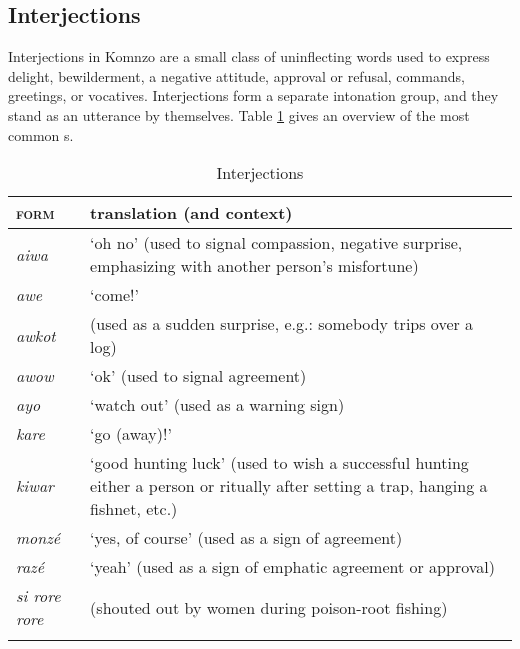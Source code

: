 \subsection{Interjections} \label{interjectionsec}
\vspace{-0.2cm}
Interjections in Komnzo are a small class of uninflecting words used to express delight, bewilderment, a negative attitude, approval or refusal, commands, greetings, or vocatives. Interjections form a separate intonation group, and they stand as an utterance by themselves. Table \ref{interjections} gives an overview of the most common s.
\vspace{-0.2cm}
\begin{table}
\caption{Interjections}
\label{interjections}
	\begin{tabular}{lp{}}
		\lsptoprule
		\textsc{form}&{translation (and context)}\\\midrule
		\emph{aiwa}&`oh no' (used to signal compassion, negative surprise, emphasizing with another person's misfortune)\\
		\emph{awe}&`come!'\\
		\emph{awkot}& (used as a sudden surprise, e.g.: somebody trips over a log)\\
		\emph{awow}&`ok' (used to signal agreement)\\
		\emph{ayo}&`watch out' (used as a warning sign)\\
		\emph{kare}&`go (away)!'\\
		\emph{kiwar}&`good hunting luck' (used to wish a successful hunting either a person or ritually after setting a trap, hanging a fishnet, etc.)\\
		\emph{monzé}&`yes, of course' (used as a sign of agreement)\\
		\emph{razé}&`yeah' (used as a sign of emphatic agreement or approval)\\
		\emph{si rore rore}& (shouted out by women during poison-root fishing)\\
		\lspbottomrule
	\end{tabular}
\end{table}%